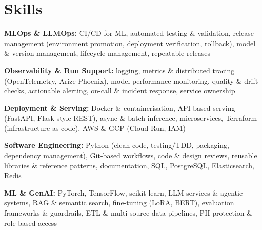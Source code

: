 \documentclass[10pt,a4paper]{article}
\begin{document}
\section{Skills}
\begin{tight}
  \item[\textcolor{accent}{\small$\bullet$}] \textbf{MLOps \& LLMOps:} CI/CD for ML, automated testing \& validation, release management (environment promotion, deployment verification, rollback), model \& version management, lifecycle management, repeatable releases
  \item[\textcolor{accent}{\small$\bullet$}] \textbf{Observability \& Run Support:} logging, metrics \& distributed tracing (OpenTelemetry, Arize Phoenix), model performance monitoring, quality \& drift checks, actionable alerting, on-call \& incident response, service ownership
  \item[\textcolor{accent}{\small$\bullet$}] \textbf{Deployment \& Serving:} Docker \& containerisation, API-based serving (FastAPI, Flask-style REST), async \& batch inference, microservices, Terraform (infrastructure as code), AWS \& GCP (Cloud Run, IAM)
  \item[\textcolor{accent}{\small$\bullet$}] \textbf{Software Engineering:} Python (clean code, testing/TDD, packaging, dependency management), Git-based workflows, code \& design reviews, reusable libraries \& reference patterns, documentation, SQL, PostgreSQL, Elasticsearch, Redis
  \item[\textcolor{accent}{\small$\bullet$}] \textbf{ML \& GenAI:} PyTorch, TensorFlow, scikit-learn, LLM services \& agentic systems, RAG \& semantic search, fine-tuning (LoRA, BERT), evaluation frameworks \& guardrails, ETL \& multi-source data pipelines, PII protection \& role-based access
\end{tight}

\end{document}
